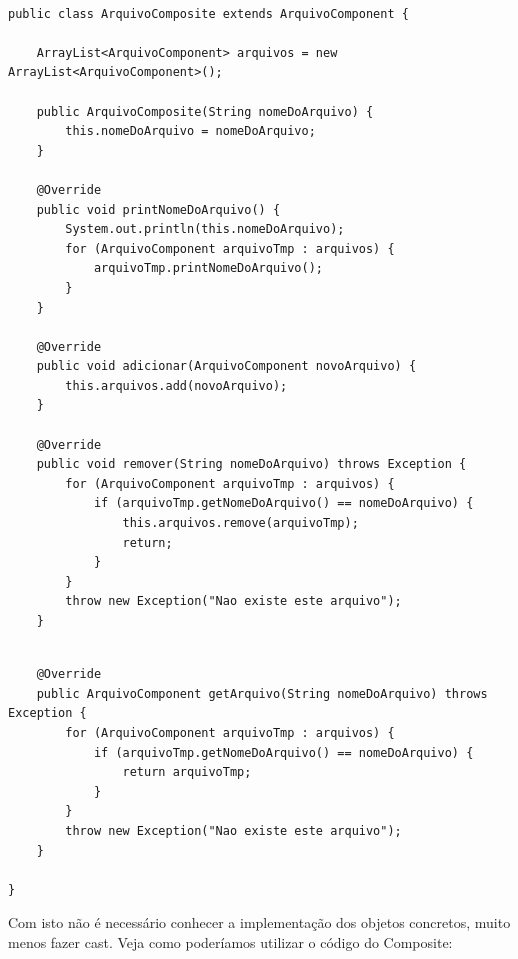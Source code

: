 \documentclass{beamer}
\begin{document}
\begin{frame}[fragile]

\begin{lstlisting}

public class ArquivoComposite extends ArquivoComponent {
 
    ArrayList<ArquivoComponent> arquivos = new ArrayList<ArquivoComponent>();
 
    public ArquivoComposite(String nomeDoArquivo) {
        this.nomeDoArquivo = nomeDoArquivo;
    }
 
    @Override
    public void printNomeDoArquivo() {
        System.out.println(this.nomeDoArquivo);
        for (ArquivoComponent arquivoTmp : arquivos) {
            arquivoTmp.printNomeDoArquivo();
        }
    }
 
    @Override
    public void adicionar(ArquivoComponent novoArquivo) {
        this.arquivos.add(novoArquivo);
    }
 
    @Override
    public void remover(String nomeDoArquivo) throws Exception {
        for (ArquivoComponent arquivoTmp : arquivos) {
            if (arquivoTmp.getNomeDoArquivo() == nomeDoArquivo) {
                this.arquivos.remove(arquivoTmp);
                return;
            }
        }
        throw new Exception("Nao existe este arquivo");
    }

\end{lstlisting}

\end{frame}

\begin{frame}[fragile]

\begin{lstlisting}
 
    @Override
    public ArquivoComponent getArquivo(String nomeDoArquivo) throws Exception {
        for (ArquivoComponent arquivoTmp : arquivos) {
            if (arquivoTmp.getNomeDoArquivo() == nomeDoArquivo) {
                return arquivoTmp;
            }
        }
        throw new Exception("Nao existe este arquivo");
    }
 
}

\end{lstlisting}

Com isto não é necessário conhecer a implementação dos objetos concretos, muito menos fazer cast. Veja como poderíamos utilizar o código do Composite:

\end{frame}
\end{document}
